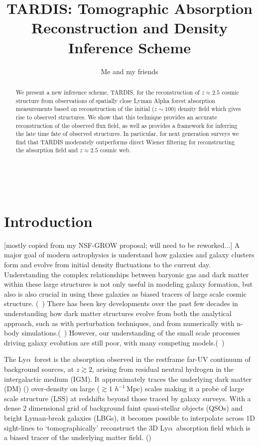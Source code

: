 \documentclass[times]{aastex62}
\newcommand{\mpc}{\ensuremath{\, h^{-1}\,\mathrm{Mpc} }}
\newcommand{\lya}{Ly$\alpha$}
\begin{document}
\title{TARDIS: Tomographic Absorption Reconstruction and Density Inference Scheme}
\author{Me and my friends}


\begin{abstract}
We present a new inference scheme, TARDIS, for the reconstruction of $z \approx 2.5$ cosmic structure from observations of spatially close Lyman Alpha forest absorption measurements based on reconstruction of the initial ($z \sim 100$) density field which gives rise to observed structures. We show that this technique provides an accurate reconstruction of the observed flux field, as well as provides a framework for inferring the late time fate of observed structures. In particular, for next generation surveys we find that TARDIS moderately outperforms direct Wiener filtering for reconstructing the absorption field and $z\approx 2.5$ cosmic web.
\end{abstract}
\
\section{Introduction}

[mostly copied from my NSF-GROW proposal; will need to be reworked...]
A major goal of modern astrophysics is understand how galaxies and galaxy clusters form and evolve from initial density fluctuations to the current day. Understanding the complex relationships between baryonic gas and dark matter within these large structures is not only useful in modeling galaxy formation, but also is also crucial in using these galaxies as biased tracers of large scale cosmic structure. (~\cite{galaxybias}) There has been key developments over the past few decades in understanding how dark matter structures evolve from both the analytical approach, such as with perturbation techniques, and from numerically with n-body simulations.(~\cite{reviewGal2}) However, our understanding of the small scale processes driving galaxy evolution are still poor, with many competing models.(~\cite{reviewGal})

The \lya\ forest is the absorption observed in the restframe far-UV continuum of background 
sources, at $z \gtrsim 2$, 
arising from residual neutral hydrogen in the intergalactic
medium (IGM). It approximately traces the underlying dark matter (DM) (\cite{BiGe})
over-density on large ($\gtrsim 1\,\mpc$) scales making it a probe of large scale structure (LSS) at redshifts beyond those traced by galaxy surveys. With a dense 2 dimensional grid of background faint quasi-stellar objects (QSOs) and bright Lyman-break galaxies (LBGs), it becomes possible to
interpolate across 1D sight-lines to `tomographically'
reconstruct the 3D \lya\ absorption field which is a biased tracer of the underlying matter field. (\cite{caucci}) 
\end{document}
